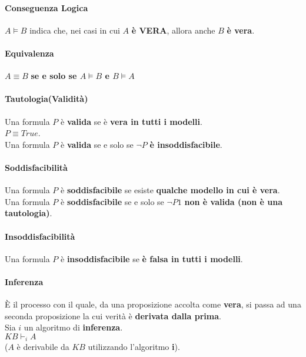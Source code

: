 \documentclass[14pt]{extarticle}
\begin{document}
\paragraph{Conseguenza Logica}
$A \models B$ indica che, nei casi in cui $A$ \textbf{è VERA}, allora anche $B$ \textbf{è vera}.
\paragraph{Equivalenza}
$A \equiv B$ \textbf{se e solo se $A \models B$ e $B \models A$}
\paragraph{Tautologia(Validità)}
Una formula $P$ è \textbf{valida} se è \textbf{vera in tutti i modelli}.\\
$P \equiv True$.\\
Una formula $P$ è \textbf{valida} se e solo se $\neg P$ \textbf{è insoddisfacibile}.
\paragraph{Soddisfacibilità}
Una formula $P$ è \textbf{soddisfacibile} se esiste \textbf{qualche modello in cui è vera}.\\
Una formula $P$ è \textbf{soddisfacibile} se e solo se $\neg P1$ \textbf{non è valida (non è una tautologia)}.
\paragraph{Insoddisfacibilità}
Una formula $P$ è \textbf{insoddisfacibile} se \textbf{è falsa in tutti i modelli}.
\paragraph{Inferenza}
È il processo con il quale, da una proposizione accolta come \textbf{vera}, si passa ad una seconda proposizione la cui verità è \textbf{derivata dalla prima}.\\
Sia $i$ un algoritmo di \textbf{inferenza}.\\
$KB \vdash_i A$\\
($A$ è derivabile da $KB$ utilizzando l'algoritmo \textbf{i}).
\end{document}
